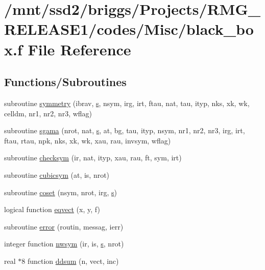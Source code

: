 \hypertarget{black__box_8f}{\section{/mnt/ssd2/briggs/\-Projects/\-R\-M\-G\-\_\-\-R\-E\-L\-E\-A\-S\-E1/codes/\-Misc/black\-\_\-box.f File Reference}
\label{black__box_8f}
}
\subsection*{Functions/\-Subroutines}
\begin{DoxyCompactItemize}
\item 
subroutine \hyperlink{black__box_8f_aa8c60775d6ede4c248f7e628067e80bd}{symmetry} (ibrav, \hyperlink{_t_d_d_f_t_2_common_2init__wf__gaussian_8c_ac9562ee4ecb3b8aeebeb04656e7e57a9}{s}, nsym, irg, irt, ftau, nat, tau, ityp, nks, xk, wk, celldm, nr1, nr2, nr3, wflag)
\item 
subroutine \hyperlink{black__box_8f_a228181799340b9690ba34df9d7dbc188}{sgama} (nrot, nat, \hyperlink{_t_d_d_f_t_2_common_2init__wf__gaussian_8c_ac9562ee4ecb3b8aeebeb04656e7e57a9}{s}, at, bg, tau, ityp, nsym, nr1, nr2, nr3, irg, irt, ftau, rtau, npk, nks, xk, wk, xau, rau, invsym, wflag)
\item 
subroutine \hyperlink{black__box_8f_af9d5c5de14abfc2cdd950ef64a22cd9a}{checksym} (ir, nat, ityp, xau, rau, ft, sym, irt)
\item 
subroutine \hyperlink{black__box_8f_afd30f1ab3606418bca5f5c3ce41cdb63}{cubicsym} (at, is, nrot)
\item 
subroutine \hyperlink{black__box_8f_a20725d8bc8e6b5dfdb4342d418038b14}{coset} (nsym, nrot, irg, \hyperlink{_t_d_d_f_t_2_common_2init__wf__gaussian_8c_ac9562ee4ecb3b8aeebeb04656e7e57a9}{s})
\item 
logical function \hyperlink{black__box_8f_a43bc1db018b9bcd048b0caf5b426812d}{eqvect} (x, y, f)
\item 
subroutine \hyperlink{black__box_8f_a5fc673b4bfb0a1cd366049349a3412dc}{error} (routin, messag, ierr)
\item 
integer function \hyperlink{black__box_8f_a4f2e278884df38065c9eb4a126e6300b}{nwsym} (ir, is, \hyperlink{_t_d_d_f_t_2_common_2init__wf__gaussian_8c_ac9562ee4ecb3b8aeebeb04656e7e57a9}{s}, nrot)
\item 
real $\ast$8 function \hyperlink{black__box_8f_a114968b87b658385691953610b70bba3}{ddsum} (n, vect, inc)

\end{DoxyCompactItemize}
